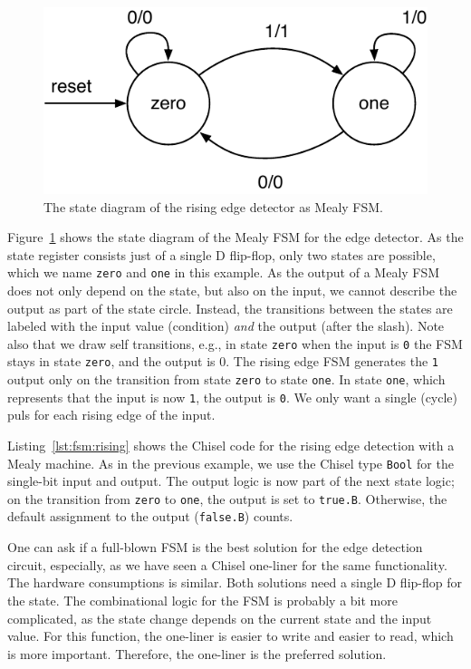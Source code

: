 \documentclass[%
    10pt,
    headinclude, footexclude,
    openright, %
    notitlepage,
    cleardoubleempty,
    headsepline,
    pointlessnumbers,
    bibtotoc, idxtotoc,
    ]{scrbook}
\newcommand{\code}[1]{{\small{\texttt{#1}}}}
\newcommand{\scale}{0.7}
\begin{document}
\begin{figure}
  \centering
  \includegraphics[scale=\scale]{figures/state-diag-mealy}
  \caption{The state diagram of the rising edge detector as Mealy FSM.}
  \label{fig:diag:mealy}
\end{figure}

Figure~\ref{fig:diag:mealy} shows the state diagram of the Mealy FSM for the
edge detector. As the state register consists just of a single D flip-flop,
only two states are possible, which we name \code{zero} and \code{one} in this
example.
As the output of a Mealy FSM does not only depend on the state, but also
on the input, we cannot describe the output as part of the state circle.
Instead, the transitions between the states are labeled with the input
value (condition) \emph{and} the output (after the slash).
Note also that we draw self transitions, e.g., in state \code{zero} when
the input is \code{0} the FSM stays in state \code{zero}, and the output is {0}.
The rising edge FSM generates the \code{1} output only on the transition
from state \code{zero} to state \code{one}. In state \code{one}, which represents
that the input is now \code{1}, the output is \code{0}. We only want a single (cycle)
puls for each rising edge of the input.


Listing~\ref{lst:fsm:rising} shows the Chisel code for the rising edge detection
with a Mealy machine.
As in the previous example, we use the Chisel type \code{Bool} for the
single-bit input and output.
The output logic is now part of the next state logic; on the transition from
\code{zero} to \code{one}, the output is set to \code{true.B}. Otherwise,
the default assignment to the output (\code{false.B}) counts.

One can ask if a full-blown FSM is the best solution for the edge detection circuit,
especially, as we have seen a Chisel one-liner for the same functionality.
The hardware consumptions is similar. Both solutions need a single D flip-flop
for the state. The combinational logic for the FSM is probably a bit more complicated, as
the state change depends on the current state and the input value.
For this function, the one-liner is easier to write and easier to read,
which is more important. Therefore, the one-liner is the preferred solution.
\end{document}
